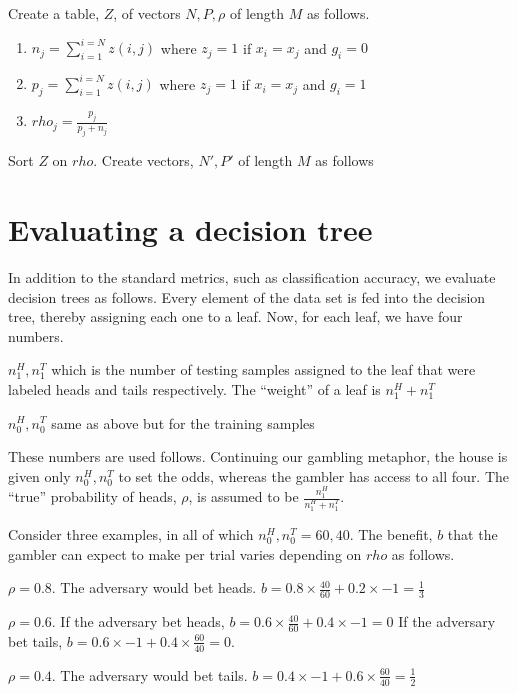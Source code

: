 Create a table, \(Z\), of vectors \(N, P, \rho\) of length \(M\) as follows.  
\begin{enumerate}
\item 
\(n_j = \sum_{i=1}^{i=N} z(i, j)\) where 
\(z_j = 1 \) if \(x_i = x_j \) and \(g_i = 0\)
\item 
\(p_j = \sum_{i=1}^{i=N} z(i, j)\) where 
\(z_j = 1 \) if \(x_i = x_j \) and \(g_i = 1\)
\item 
\(rho_j = \frac{p_j}{p_j+n_j}\)
\end{enumerate}
Sort \(Z\) on \(rho\). Create vectors, \(N', P'\) of length \(M\) as follows
\be
\item 
\ee

\newpage
\section{Evaluating a decision tree}
In addition to the standard metrics, such as classification accuracy, we
evaluate decision trees as follows. Every element of the data set is 
fed into the decision tree, thereby
assigning each one to a leaf. Now, for each leaf, we have four numbers.
\be
\item \(n^H_1, n^T_1\) which is the number of testing samples assigned 
to the leaf that were labeled heads and tails respectively. The ``weight'' of a
leaf is \(n^H_1 + n^T_1\)
\item \(n^H_0, n^T_0\) same as above but for the training samples
\ee

These numbers are used follows. Continuing our gambling metaphor,
the house is given only \(n^H_0, n^T_0\) to set the odds, whereas the gambler
has access to all four.
The ``true'' probability of heads, \(\rho\), is assumed to be 
\(\frac{n^H_1}{n^H_1+ n^T_1}\). 

Consider three examples, in all of which \(n^H_0, n^T_0 = 60, 40\). 
The benefit, \(b\) that the gambler can expect to make per trial varies
depending on \(rho\) as follows.
\be
\item \(\rho = 0.8\). The adversary would bet heads.
\(b = 0.8 \times \frac{40}{60} + 0.2 \times -1 = \frac{1}{3}\)
\item \(\rho = 0.6\). If the adversary bet heads, 
\(b = 0.6 \times \frac{40}{60} + 0.4 \times -1 = 0\)
If the adversary bet tails, 
\(b = 0.6 \times -1 + 0.4 \times \frac{60}{40} = 0\).
\item \(\rho = 0.4\). The adversary would bet tails.
\(b = 0.4 \times -1 + 0.6 \times \frac{60}{40} = \frac{1}{2}\) 
\ee

